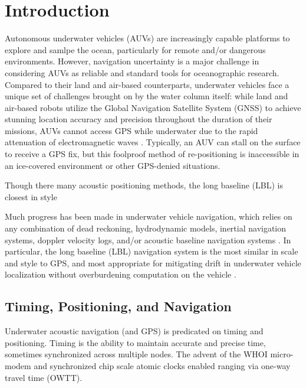 \section{Introduction}
\label{sec:1}  
Autonomous underwater vehicles (AUVs) are increasingly capable platforms to explore and samlpe the ocean, particularly for remote and/or dangerous environments.
However, navigation uncertainty is a major challenge in considering AUVs as reliable and standard tools for oceanographic research.
Compared to their land and air-based counterparts, underwater vehicles face a unique set of challenges brought on by the water column itself:  while land and air-based robots utilize the Global Navigation Satellite System (GNSS) to achieve stunning location accuracy and precision throughout the duration of their missions, AUVs cannot access GPS while underwater due to the rapid attenuation of electromagnetic waves \citep{preisig_acoustic_2007}.
Typically, an AUV can stall on the surface to receive a GPS fix, but this foolproof method of re-positioning is inaccessible in an ice-covered environment or other GPS-denied situations.

Though there many acoustic positioning methods, the long baseline (LBL) is closest in style





Much progress has been made in underwater vehicle navigation, which relies on any combination of dead reckoning, hydrodynamic models, inertial navigation systems, doppler velocity logs, and/or acoustic baseline navigation systems \citep{paull_auv_2014}.
In particular, the long baseline (LBL) navigation system is the most similar in scale and style to GPS, and most appropriate for mitigating drift in underwater vehicle localization without overburdening computation on the vehicle \citep{van_uffelen_global_2021}.

\subsection{Timing, Positioning, and Navigation}

Underwater acoustic navigation (and GPS) is predicated on timing and positioning.
Timing is the ability to maintain accurate and precise time, sometimes synchronized across multiple nodes.
 The advent of the WHOI micro-modem \citep{singh_underwater_2006} and synchronized chip scale atomic clocks \citep{gardner_second_2016} enabled ranging via one-way travel time (OWTT).

